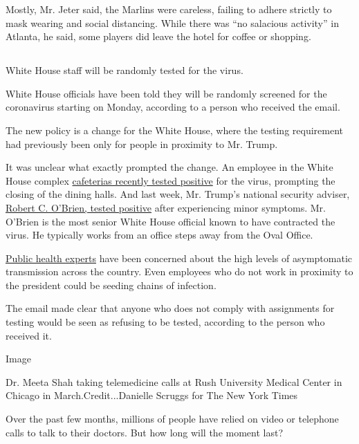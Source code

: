Mostly, Mr. Jeter said, the Marlins were careless, failing to adhere
strictly to mask wearing and social distancing. While there was ``no
salacious activity'' in Atlanta, he said, some players did leave the
hotel for coffee or shopping.

\hypertarget{-9}{%
\subsection{}\label{-9}}

White House staff will be randomly tested for the virus.

White House officials have been told they will be randomly screened for
the coronavirus starting on Monday, according to a person who received
the email.

The new policy is a change for the White House, where the testing
requirement had previously been only for people in proximity to Mr.
Trump.

It was unclear what exactly prompted the change. An employee in the
White House complex
\href{https://www.nytimes3xbfgragh.onion/2020/07/22/us/politics/white-house-employee-covid-19.html}{cafeterias
recently tested positive} for the virus, prompting the closing of the
dining halls. And last week, Mr. Trump's national security adviser,
\href{https://www.nytimes3xbfgragh.onion/2020/07/27/us/politics/robert-obrien-virus.html}{Robert
C. O'Brien, tested positive} after experiencing minor symptoms. Mr.
O'Brien is the most senior White House official known to have contracted
the virus. He typically works from an office steps away from the Oval
Office.

\href{https://www.nytimes3xbfgragh.onion/2020/08/02/health/dr-birx-coronavirus-phase.html}{Public
health experts} have been concerned about the high levels of
asymptomatic transmission across the country. Even employees who do not
work in proximity to the president could be seeding chains of infection.

The email made clear that anyone who does not comply with assignments
for testing would be seen as refusing to be tested, according to the
person who received it.

Image

Dr. Meeta Shah taking telemedicine calls at Rush University Medical
Center in Chicago in March.Credit...Danielle Scruggs for The New York
Times

Over the past few months, millions of people have relied on video or
telephone calls to talk to their doctors. But how long will the moment
last?

